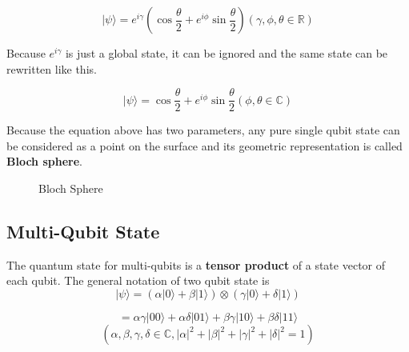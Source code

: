 \begin{equation}
	|\psi\rangle = e^{i\gamma} (\cos{\frac{\theta}{2}} + e^{i\phi} \sin{\frac{\theta}{2}}) (\gamma, \phi, \theta \in \mathbb{R})
\end{equation} 

	Because $e^{i\gamma}$ is just a global state, it can be ignored and the same state can be rewritten like this.
	
\begin{equation}
	 |\psi\rangle =  \cos{\frac{\theta}{2}} + e^{i\phi} \sin{\frac{\theta}{2}} (\phi, \theta \in \mathbb{C})
\end{equation} 

	Because the equation above has two parameters,  any pure single qubit state can be considered as a point on the surface and its geometric representation is called \textbf{Bloch sphere}.
	
\begin{figure}[ht]
\centering
{}
 \caption{Bloch Sphere}
 \end{figure}
	
 \subsection{Multi-Qubit State}
  The quantum state for multi-qubits is a \textbf{tensor product} of a state vector of each qubit.  The general notation of two qubit state is
   $$ |\psi\rangle = (\alpha |0\rangle + \beta |1\rangle) \otimes  (\gamma |0\rangle + \delta |1\rangle) $$
   
\begin{equation}
    = \alpha \gamma |00\rangle + \alpha \delta |01\rangle + \beta \gamma |10\rangle + \beta \delta |11\rangle 
\end{equation}
  $$(\alpha, \beta, \gamma, \delta \in \mathbb{C}, |\alpha|^2+|\beta|^2+|\gamma|^2+|\delta|^2=1)$$
  

